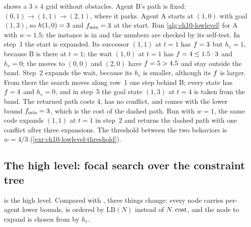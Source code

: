 \begin{example}
\label{ex:ch10-lowlevel}
 shows a $3 \times 4$ grid without obstacles.
Agent B's path is fixed: $(0,1) \to (1,1) \to (2,1)$, where it parks. Agent A
starts at $(1,0)$ with goal $(1,3)$, so $h(1,0) = 3$ and
$f_{\min} = 3$ at the start. Run \cref{alg:ch10-lowlevel} for A with $w = 1.5$; the instance is
 in  and the numbers are
checked by its self-test. In step~1 the start is expanded. Its successor
$(1,1)$ at $t = 1$ has $f = 3$ but $h_c = 1$, because B is there at
$t = 1$; the wait $(1,0)$ at $t = 1$ has $f = 4 \le 1.5 \cdot 3$ and
$h_c = 0$; the moves to $(0,0)$ and $(2,0)$ have $f = 5 > 4.5$ and stay
outside the band. Step~2 expands the wait, because its $h_c$ is smaller,
although its $f$ is larger. From there the search moves along row~1 one
step behind B; every state has $f = 4$ and $h_c = 0$, and in step~5 the
goal state $(1,3)$ at $t = 4$ is taken from the band. The returned path costs
$4$, has no conflict, and comes with the lower bound $f_{\min} = 3$,
which is the cost of the dashed path. Run with $w = 1$, the same code expands
$(1,1)$ at $t = 1$ in step~2 and returns the dashed path with one conflict
after three expansions. The threshold between the two behaviors is
$w = 4/3$ (\cref{exr:ch10-lowlevel-threshold}).
\end{example}

\subsection{The high level: focal search over the constraint tree}
\label{sec:ch10-highlevel}

 is the high level. Compared with \cbs, three things
change: every node carries per-agent lower bounds, \Open is ordered by
$\mathrm{LB}(N)$ instead of $N.\operatorname{cost}$, and the node to expand is chosen from
\Focal by $h_c$.

